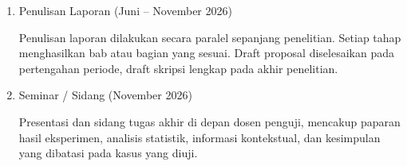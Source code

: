 \begin{enumerate}
    \item Penulisan Laporan (Juni -- November 2026)
    
    Penulisan laporan dilakukan secara paralel sepanjang penelitian. Setiap tahap menghasilkan bab atau bagian yang sesuai. Draft proposal diselesaikan pada pertengahan periode, draft skripsi lengkap pada akhir penelitian.
    
    \item Seminar / Sidang (November 2026)
    
    Presentasi dan sidang tugas akhir di depan dosen penguji, mencakup paparan hasil eksperimen, analisis statistik, informasi kontekstual, dan kesimpulan yang dibatasi pada kasus yang diuji.
\end{enumerate}
